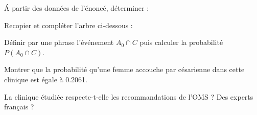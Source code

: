 \begin{questions}
	\question[1] \'A partir des données de l'énoncé, déterminer :
	
	\question[1] Recopier et compléter l'arbre ci-dessous :
	
	
	
	\question[1] Définir par une phrase l'événement $A_0 \cap C$ puis calculer la probabilité $P(A_0 \cap C)$.
	
	\question[1] Montrer que la probabilité qu'une femme accouche par césarienne dans cette clinique est égale à \num{0.2061}.
	
	\question[1] La clinique étudiée respecte-t-elle les recommandations de l'OMS ? Des experts français ?
		
\end{questions}